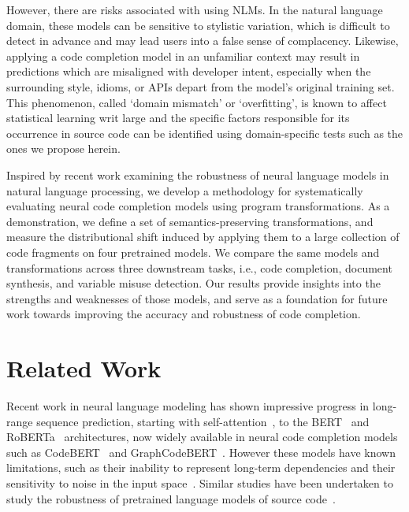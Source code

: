\documentclass[usenames,dvipsnames]{article} %
\begin{document}
  However, there are risks associated with using NLMs. In the natural language domain, these models can be sensitive to stylistic variation, which is difficult to detect in advance and may lead users into a false sense of complacency. Likewise, applying a code completion model in an unfamiliar context may result in predictions which are misaligned with developer intent, especially when the surrounding style, idioms, or APIs depart from the model's original training set. This phenomenon, called `domain mismatch' or `overfitting', is known to affect statistical learning writ large and the specific factors responsible for its occurrence in source code can be identified using domain-specific tests such as the ones we propose herein.

  Inspired by recent work examining the robustness of neural language models in natural language processing, we develop a methodology for systematically evaluating neural code completion models using program transformations. As a demonstration, we define a set of semantics-preserving transformations, and measure the distributional shift induced by applying them to a large collection of code fragments on four pretrained models. We compare the same models and transformations across three downstream tasks, i.e., code completion, document synthesis, and variable misuse detection. Our results provide insights into the strengths and weaknesses of those models, and serve as a foundation for future work towards improving the accuracy and robustness of code completion.

  \section{Related Work}\label{sec:related_work}

  Recent work in neural language modeling has shown impressive progress in long-range sequence prediction, starting with self-attention~\citep{vaswani2017attention}, to the BERT~\citep{devlin2018bert} and RoBERTa~\citep{liu2019roberta} architectures, now widely available in neural code completion models such as CodeBERT~\citep{feng2020codebert} and GraphCodeBERT~\citep{guo2021graphcodebert}. However these models have known limitations, such as their inability to represent long-term dependencies and their sensitivity to noise in the input space~\cite{sun2020adv}. Similar studies have been undertaken to study the robustness of pretrained language models of source code~\citep{bielik2020adversarial, zhou2021adversarial}.
\end{document}
